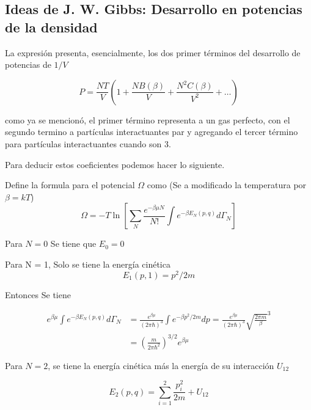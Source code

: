 \subsection{Ideas de J. W. Gibbs: Desarrollo en potencias de la densidad}

La expresión presenta, esencialmente, los dos primer términos del desarrollo
de potencias de $1/V$

\begin{equation}
    P = \frac{NT}{V}\left(
        1 + \frac{NB(\beta)}{V} + \frac{N^2 C(\beta)}{V^2} + \ldots
    \right)
\end{equation}

como ya se mencionó, el primer término representa a un gas perfecto,
con el segundo termino a partículas interactuantes par y agregando 
el tercer término para partículas interactuantes cuando son 3.

Para deducir estos coeficientes podemos hacer lo siguiente.

\parencite[p.~124]{landau} Define la formula para el potencial $\Omega$
como (Se a modificado la temperatura por $\beta = kT$)
\begin{equation}
    \label{eq:potential}
    \Omega = -T \ln \left[
        \sum_{N}\frac{e^{-\beta\mu N}}{N!}\int e^{-\beta E_N(p, q)} d\Gamma_N
    \right]
\end{equation}



Para $N = 0$ Se tiene que $E_0 = 0$

Para N = 1, Solo se tiene la energía cinética
\begin{equation}
    E_1(p, 1) = p^2/2m
\end{equation}

Entonces Se tiene

\begin{align*}
    e^{\beta\mu} \int e^{-\beta E_N(p, q)} d\Gamma_N
     &= \frac{e^{\beta\mu}}{{(2\pi\hbar)}^3}  \int e^{-\beta p^2/2m} dp
     = \frac{e^{\beta\mu}}{{(2\pi\hbar)}^3} \sqrt{\frac{2 \pi m}{\beta}}^3\\
     &= {\left(\frac{m}{2\pi\hbar^2}\right)}^{3/2} e^{\beta\mu}
\end{align*}

Para $N = 2$, se tiene la energía cinética más la energía
de su interacción $U_{12}$

\begin{equation}
    E_2(p, q) = \sum_{i=1}^{2} \frac{p_i^2}{2m} + {U_{12}}
\end{equation}

